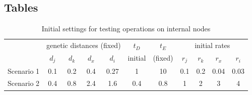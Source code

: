 \documentclass{bmcart}
\begin{document}
\begin{backmatter}
%
%

\clearpage
\section*{Tables}
\begin{table}[h!]
  \centering
\begin{tabular}{c|cccc|c|c|cccc}
  \hline
&\multicolumn{4}{c|}{genetic distances (fixed)}&$t_D$&$t_E$&\multicolumn{4}{c}{initial rates}\\
&${d_j}$&${d_k}$&${d_x}$&${d_i}$&initial&(fixed)&${r_j}$&${r_k}$&${r_x}$&${r_i}$\\
\hline
Scenario 1&0.1&0.2&0.4&0.27&1&10&0.1&0.2&0.04&0.03\\
\hline
Scenario 2&0.4&0.8&2.4&1.6&0.4&0.8&1&2&3&4\\
  \hline
\end{tabular}
\caption{Initial settings for testing operations on internal nodes}\label{ini_inter}
\end{table}


\end{backmatter}
\end{document}
